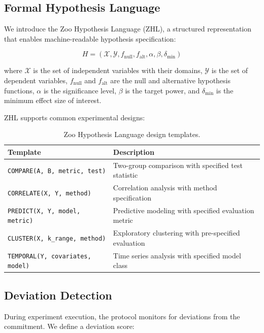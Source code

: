 \documentclass[11pt,a4paper]{article}
\begin{document}
\subsection{Formal Hypothesis Language}

We introduce the Zoo Hypothesis Language (ZHL), a structured representation that enables machine-readable hypothesis specification:

\begin{equation}
    H = (\mathcal{X}, \mathcal{Y}, f_{\text{null}}, f_{\text{alt}}, \alpha, \beta, \delta_{\min})
\end{equation}

\noindent where $\mathcal{X}$ is the set of independent variables with their domains, $\mathcal{Y}$ is the set of dependent variables, $f_{\text{null}}$ and $f_{\text{alt}}$ are the null and alternative hypothesis functions, $\alpha$ is the significance level, $\beta$ is the target power, and $\delta_{\min}$ is the minimum effect size of interest.

ZHL supports common experimental designs:

\begin{table}[H]
\centering
\caption{Zoo Hypothesis Language design templates.}
\label{tab:zhl_templates}
\begin{tabularx}{\textwidth}{@{}lX@{}}
\toprule
\textbf{Template} & \textbf{Description} \\
\midrule
\texttt{COMPARE(A, B, metric, test)} & Two-group comparison with specified test statistic \\
\texttt{CORRELATE(X, Y, method)} & Correlation analysis with method specification \\
\texttt{PREDICT(X, Y, model, metric)} & Predictive modeling with specified evaluation metric \\
\texttt{CLUSTER(X, k\_range, method)} & Exploratory clustering with pre-specified evaluation \\
\texttt{TEMPORAL(Y, covariates, model)} & Time series analysis with specified model class \\
\bottomrule
\end{tabularx}
\end{table}

\subsection{Deviation Detection}

During experiment execution, the protocol monitors for deviations from the commitment.
We define a deviation score:
\end{document}
